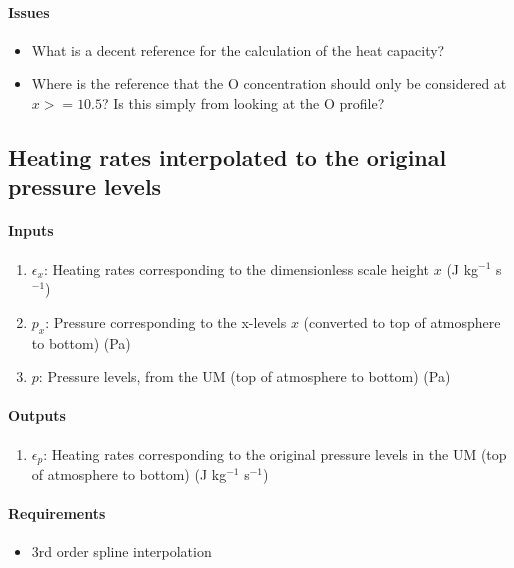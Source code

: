    \paragraph{Issues}
   \begin{itemize}
   \item What is a decent reference for the calculation of the heat capacity?
   \item Where is the reference that the O concentration should only be 
     considered at $x >= 10.5$? Is this simply from looking at the O profile?
   \end{itemize}


\subsection{Heating rates interpolated to the original pressure levels}

   \paragraph{Inputs}
   \begin{enumerate}
   \item $\epsilon_x$: Heating rates corresponding to the dimensionless 
     scale height $x$ (J kg$^{-1}$ s$^{-1}$)
   \item $p_x$: Pressure corresponding to the x-levels $x$ (converted
     to top of atmosphere to bottom) (Pa)
   \item $p$: Pressure levels, from the UM (top of atmosphere to bottom)
     (Pa)
   \end{enumerate}

   \paragraph{Outputs}
   \begin{enumerate}
   \item $\epsilon_p$: Heating rates corresponding to the original pressure 
     levels in the UM (top of atmosphere to bottom) (J kg$^{-1}$ s$^{-1}$)
   \end{enumerate}

   \paragraph{Requirements}
   \begin{itemize}   
   \item 3rd order spline interpolation
   \end{itemize}



